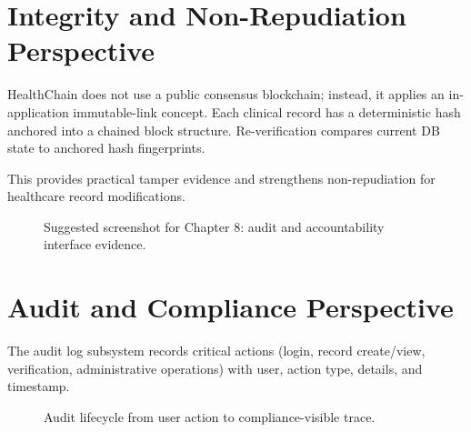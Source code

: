 \documentclass[12pt,a4paper]{report}
\begin{document}
\section{Integrity and Non-Repudiation Perspective}

HealthChain does not use a public consensus blockchain; instead, it applies an in-application immutable-link concept. Each clinical record has a deterministic hash anchored into a chained block structure. Re-verification compares current DB state to anchored hash fingerprints.

This provides practical tamper evidence and strengthens non-repudiation for healthcare record modifications.

\begin{figure}[H]
\centering
{}
\caption{Suggested screenshot for Chapter 8: audit and accountability interface evidence.}
\label{fig:placeholder-audit-ui}
\end{figure}

\section{Audit and Compliance Perspective}

The audit log subsystem records critical actions (login, record create/view, verification, administrative operations) with user, action type, details, and timestamp.

\begin{figure}[htbp]
\centering
{}
\caption{Audit lifecycle from user action to compliance-visible trace.}
\label{fig:audit-lifecycle}
\end{figure}
\end{document}
